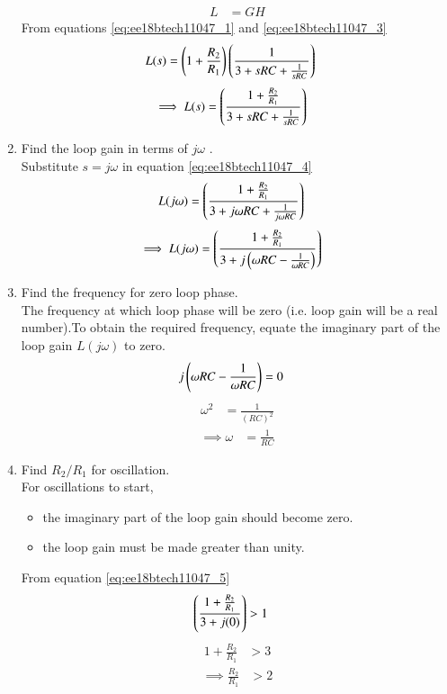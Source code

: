 \begin{enumerate}[label=\thesection.\arabic*.,ref=\thesection.\theenumi]
\begin{align}
L &= GH
\end{align}
From equations \eqref{eq:ee18btech11047_1} and \eqref{eq:ee18btech11047_3}
\begin{align}
L(s) &= \left(1 + \frac{R_{2}}{R_{1}}\right)\left(\frac{1}{3+sRC+\frac{1}{sRC}}\right)
\end{align}
\begin{align}
\label{eq:ee18btech11047_4}
\implies L(s) &= \brak{\frac{1+\frac{R_{2}}{R_{1}}}{3+sRC+\frac{1}{sRC}}}
\end{align}
%
\item Find the loop gain in terms of $j\omega$ .\\
\solution Substitute $s = j\omega$ in equation \eqref{eq:ee18btech11047_4}
\begin{align} 
L(j\omega)&= \left(\frac{1+\frac{R_{2}}{R_{1}}}{3+j\omega RC+\frac{1}{j\omega RC}}\right)
\end{align}
\begin{align}
\label{eq:ee18btech11047_5}
\implies L(j\omega)&= \brak{\frac{1+\frac{R_{2}}{R_{1}}}{3+ j \brak{\omega RC-\frac{1}{\omega RC}}}}
\end{align}
\item Find the frequency for zero loop phase.\\
\solution The frequency at which loop phase will be zero (i.e. loop gain will be a real number).To obtain the required frequency, equate the imaginary part of the loop gain $L(j \omega )$ to zero.
\begin{align}
j\left(\omega RC - \frac{1}{\omega RC}\right) &= 0
\end{align}
\begin{align}
\omega^{2} &= \frac{1}{(RC)^{2}}
\end{align}
\begin{align}
\implies \omega &= \frac{1}{RC}
\end{align}
%
\item Find $R_{2}/R_{1}$ for oscillation.\\
\solution For oscillations to start, 
\begin{itemize}
    \item the imaginary part of the loop gain should become zero.
    \item the loop gain must be made greater than unity.
\end{itemize}
From equation \eqref{eq:ee18btech11047_5} 
\begin{align}
\left(\frac{1+\frac{R_{2}}{R_{1}}}{3+j(0)}\right) &> 1
\end{align}
\begin{align}
1+\frac{R_{2}}{R_{1}} &> 3
\end{align}
\begin{align}
\implies \frac{R_{2}}{R_{1}} &> 2
\end{align}
\end{enumerate}
